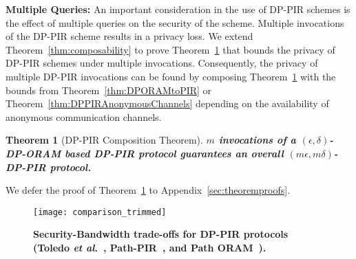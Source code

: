 \documentclass[USenglish,oneside,twocolumn]{article}
\newtheorem{theorem}{Theorem}
\newcommand{\etal}{\textit{et al}.}
\begin{document}
\textbf{Multiple Queries: }
An important consideration in the use of DP-PIR schemes is the effect of multiple queries on the security of the scheme. Multiple invocations of the DP-PIR scheme results in a privacy loss.
We extend Theorem~\ref{thm:composability} to prove Theorem~\ref{thm:DPPIRComposition} that bounds the privacy of DP-PIR schemes under multiple invocations. Consequently, the privacy of multiple DP-PIR invocations can be found by composing Theorem~\ref{thm:DPPIRComposition} with the bounds from Theorem~\ref{thm:DPORAMtoPIR} or Theorem~\ref{thm:DPPIRAnonymousChannels} depending on the availability of anonymous communication channels.
\begin{theorem}[DP-PIR Composition Theorem]\label{thm:DPPIRComposition}
\textbf{$m$ invocations of a $(\epsilon, \delta)$-DP-ORAM based DP-PIR protocol guarantees an overall $(m\epsilon, m\delta)$-DP-PIR protocol.}
\end{theorem}
We defer the proof of Theorem~\ref{thm:DPPIRComposition} to Appendix~\ref{sec:theoremproofs}.











\begin{figure}[t]
\centering
\texttt{[image: comparison\_trimmed]}
\vspace{-5pt}
\caption{\textbf{Security-Bandwidth trade-offs for DP-PIR protocols (Toledo \etal~\cite{goldbergDPPIR}, Path-PIR~\cite{mayberry2014efficient}, and Path ORAM~\cite{pathoram}).}}
\label{fig:comparison}
\end{figure}
\end{document}
